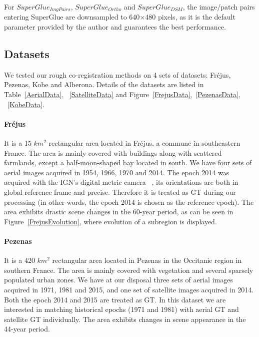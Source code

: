For $SuperGlue_{ImgPairs}$, $SuperGlue_{Ortho}$ and $SuperGlue_{DSM}$, the image/patch pairs entering SuperGlue are downsampled to 640$\times$480 pixels, as it is the default parameter provided by the author and guarantees the best performance. 


\subsection{Datasets}
\label{Datasets}
We tested our rough co-registration methods on 4 sets of datasets: Fr{\'e}jus, Pezenas, Kobe and Alberona. Details of the datasets are listed in Table~\ref{AerialData}, ~\ref{SatelliteData} and Figure~\ref{FrejusData},~\ref{PezenasData}, ~\ref{KobeData}.
\par
\paragraph{Fr{\'e}jus} It is a 15 $km^2$ rectangular area located in Fr{\'e}jus, a commune in southeastern France. The area is mainly covered with buildings along with scattered farmlands, except a half-moon-shaped bay located in south. We have four sets of aerial images acquired in 1954, 1966, 1970 and 2014. The epoch 2014 was acquired with the \ac{IGN}'s digital metric camera ~\cite{souchon2010ign}, its orientations are both in global reference frame and precise. Therefore it is treated as \ac{GT} during our processing (in other words, the epoch 2014 is chosen as the reference epoch). 
The area exhibits drastic scene changes in the 60-year period, as can be seen in Figure~\ref{FrejusEvolution}, where evolution of a subregion is displayed.\\
\paragraph{Pezenas} It is a 420 $km^2$ rectangular area located in Pezenas in the Occitanie region in southern France. The area is mainly covered with vegetation and several sparsely populated urban zones. We have at our disposal three sets of aerial images acquired in 1971, 1981 and 2015, and one set of satellite images acquired in 2014. Both the epoch 2014 and 2015 are treated as \ac{GT}. In this dataset we are interested in matching historical epochs (1971 and 1981) with aerial \ac{GT} and satellite \ac{GT} individually. The area exhibits changes in scene appearance in the 44-year period.\\
